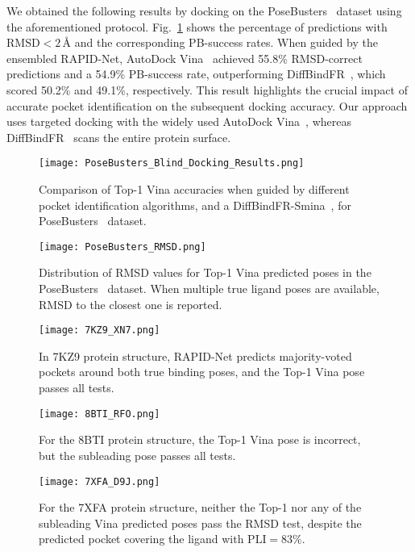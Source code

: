 \documentclass[10pt,conference]{IEEEtran}
\begin{document}
We obtained the following results by docking on the PoseBusters~\cite{Buttenschoen2024} dataset using the aforementioned protocol. Fig.~\ref{PB_blind_docking_results_Fig} shows the percentage of predictions with $\text{RMSD} < 2\,\text{\AA}$ and the corresponding PB-success rates. When guided by the ensembled RAPID-Net, AutoDock Vina~\cite{eberhardt2021autodock} achieved 55.8\% RMSD-correct predictions and a 54.9\% PB-success rate, outperforming DiffBindFR~\cite{zhu2024diffbindfr}, which scored 50.2\% and 49.1\%, respectively. This result highlights the crucial impact of accurate pocket identification on the subsequent docking accuracy. Our approach uses targeted docking with the widely used AutoDock Vina~\cite{eberhardt2021autodock}, whereas DiffBindFR~\cite{zhu2024diffbindfr} scans the entire protein surface.


\begin{figure}[]{}
\texttt{[image: PoseBusters\_Blind\_Docking\_Results.png]}
  \caption{Comparison of Top-1 Vina accuracies when guided by different pocket identification algorithms, and a DiffBindFR-Smina~\cite{zhu2024diffbindfr}, for PoseBusters~\cite{Buttenschoen2024} dataset.}
\label{PB_blind_docking_results_Fig}
\end{figure}

\begin{figure}[]{}
\texttt{[image: PoseBusters\_RMSD.png]}
\caption{Distribution of RMSD values for Top-1 Vina predicted poses in the PoseBusters~\cite{Buttenschoen2024} dataset. When multiple true ligand poses are available, RMSD to the closest one is reported.}
\label{PB_RMSD_Fig}
\end{figure}

\begin{figure}[]{}
\texttt{[image: 7KZ9\_XN7.png]}
  \caption{In 7KZ9 protein structure, RAPID-Net predicts majority-voted pockets around both true binding poses, and the Top-1 Vina pose passes all tests.}
\label{7KZ9_XN7_Fig}
\end{figure}

\begin{figure}[]{}
\texttt{[image: 8BTI\_RFO.png]}
\caption{For the 8BTI protein structure, the Top-1 Vina pose is incorrect, but the subleading pose passes all tests.}
\label{8BTI_RFO_Fig}
\end{figure}

\begin{figure}[]{}
\texttt{[image: 7XFA\_D9J.png]}
\caption{For the 7XFA protein structure, neither the Top-1 nor any of the subleading Vina predicted poses pass the RMSD test, despite the predicted pocket covering the ligand with $\text{PLI} = 83\%$.}
\label{7XFA_D9J_Fig}
\end{figure}
\end{document}

